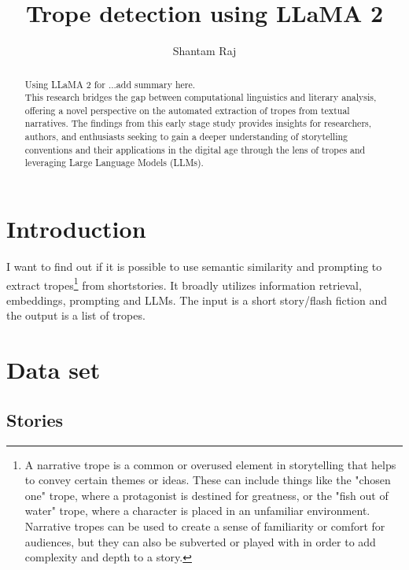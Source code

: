 \documentclass[11pt]{article}
\title{Trope detection using LLaMA 2 \\


}
\author{Shantam Raj}
\begin{document}
\maketitle

\begin{abstract}
Using LLaMA 2 for \cite{touvron_2023_llama}...add summary here.
\\
This research bridges the gap between computational linguistics and literary analysis, offering a novel perspective on the automated extraction of tropes from textual narratives. The findings from this early stage study provides insights for researchers, authors, and enthusiasts seeking to gain a deeper understanding of storytelling conventions and their applications in the digital age through the lens of tropes and leveraging Large Language Models (LLMs).
\end{abstract}

\section{Introduction}
I want to find out if it is possible to use semantic similarity and prompting to extract tropes\footnote[1]{A narrative trope is a common or overused element in storytelling that helps to convey certain themes or ideas. These can include things like the "chosen one" trope, where a protagonist is destined for greatness, or the "fish out of water" trope, where a character is placed in an unfamiliar environment. Narrative tropes can be used to create a sense of familiarity or comfort for audiences, but they can also be subverted or played with in order to add complexity and depth to a story.} from shortstories. It broadly utilizes information retrieval, embeddings, prompting and LLMs. The input is a short story/flash fiction and the output is a list of tropes.

\section{Data set}

\subsection{Stories}
\end{document}
